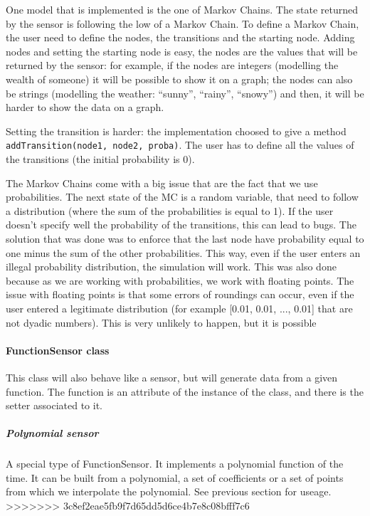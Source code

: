One model that is implemented is the one of Markov Chains. The state returned
by the sensor is following the low of a Markov Chain. To define a Markov
Chain, the user need to define the nodes, the transitions and the starting
node. Adding nodes and setting the starting node is easy, the nodes are the
values that will be returned by the sensor: for example, if the nodes are
integers (modelling the wealth of someone) it will be possible to show it
on a graph; the nodes can also be strings (modelling the weather: ``sunny'',
``rainy'', ``snowy'') and then, it will be harder to show the data on a graph.

Setting the transition is harder: the implementation choosed to give a method
\verb!addTransition(node1, node2, proba)!. The user has to define all the
values of the transitions (the initial probability is 0).

The Markov Chains come with a big issue that are the fact that we use
probabilities. The next state of the MC is a random variable, that need to
follow a distribution (where the sum of the probabilities is equal to 1). If
the user doesn't specify well the probability of the transitions, this can lead
to bugs. The solution that was done was to enforce that the last node have
probability equal to one minus the sum of the other probabilities. This way,
even if the user enters an illegal probability distribution, the simulation
will work.
This was also done because as we are working with probabilities, we work
with floating points. The issue with floating points is that some errors of
roundings can occur, even if the user entered a legitimate distribution (for
example [0.01, 0.01, ..., 0.01] that are not dyadic numbers). This is very
unlikely to happen, but it is possible

\paragraph{FunctionSensor class}

This class will also behave like a sensor, but will generate data from a given
function. The function is an attribute of the instance of the class, and there
is the setter associated to it.

\subparagraph{Polynomial sensor}

A special type of FunctionSensor. It implements a polynomial function of
the time. It can be built from a polynomial, a set of coefficients or a set
of points from which we interpolate the polynomial. See previous section for
useage.
>>>>>>> 3c8ef2eae5fb9f7d65dd5d6ce4b7e8c08bfff7c6

